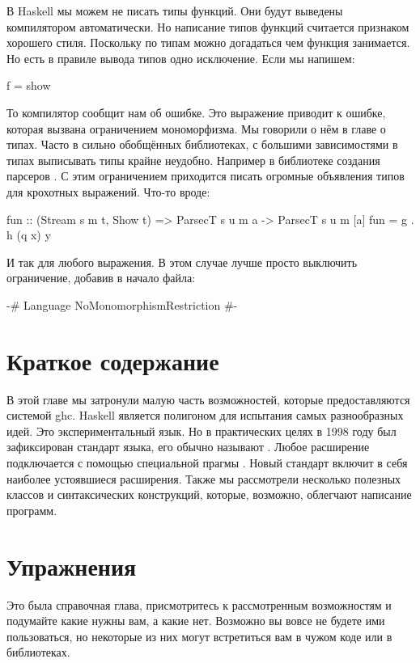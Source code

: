 В Haskell мы можем не писать типы функций. Они будут
выведены компилятором автоматически. Но написание 
типов функций считается признаком хорошего стиля. 
Поскольку по типам можно догадаться чем функция
занимается. Но есть в правиле вывода типов одно исключение. 
Если мы напишем:

\begin{code}
f = show
\end{code}

То компилятор сообщит нам об ошибке. Это выражение приводит
к ошибке, которая вызвана ограничением мономорфизма. 
Мы говорили о нём в главе о типах.
Часто в сильно обобщённых библиотеках, с большими зависимостями в типах
выписывать типы крайне неудобно. Например в библиотеке
создания парсеров . С этим ограничением 
приходится писать огромные объявления типов
для крохотных выражений. Что-то вроде:

\begin{code}
fun :: (Stream s m t, Show t) => ParsecT s u m a -> ParsecT s u m [a]
fun = g . h (q x) y
\end{code}

И так для любого выражения. В этом случае лучше просто выключить
ограничение, добавив в начало файла:

\begin{code}
{-# Language NoMonomorphismRestriction #-}
\end{code}

\section{Краткое содержание}

В этой главе мы затронули малую часть возможностей,
которые предоставляются системой ghc. Haskell является
полигоном для испытания самых разнообразных идей. 
Это экспериментальный язык. Но в практических целях в 1998
году был зафиксирован стандарт языка, его обычно называют
. Любое расширение
подключается с помощью специальной прагмы .
Новый стандарт  включит в себя наиболее
устоявшиеся расширения. Также мы рассмотрели несколько полезных классов
и синтаксических конструкций, которые, возможно, облегчают написание
программ.

\section{Упражнения}

Это была справочная глава, присмотритесь к рассмотренным возможностям
и подумайте какие нужны вам, а какие нет. Возможно вы вовсе не будете
ими пользоваться, но некоторые из них могут встретиться вам в 
чужом коде или в библиотеках. 


